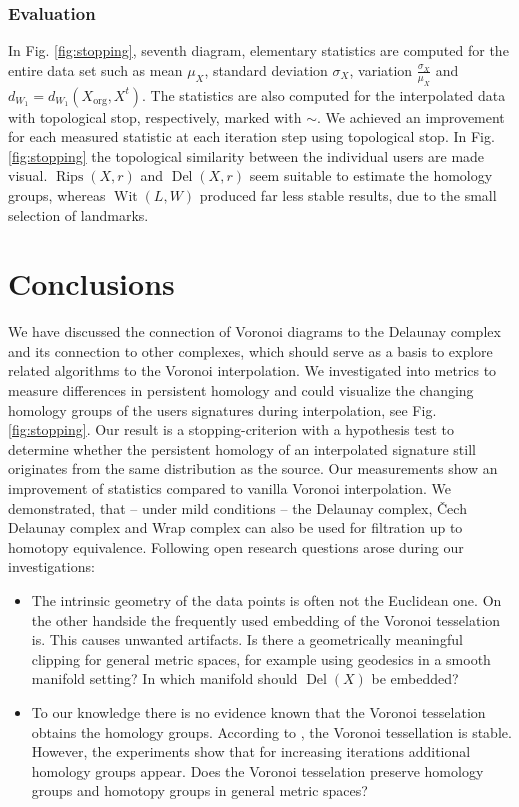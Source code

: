 \documentclass[runningheads]{llncs}
\DeclareMathOperator{\Rips}{\text{Rips}}
\DeclareMathOperator{\Del}{\text{Del}}
\DeclareMathOperator{\Wit}{\text{Wit}}
\begin{document}
\subsubsection{Evaluation} In Fig. \ref{fig:stopping}, seventh diagram, elementary statistics are computed for the entire data set such as mean $\mu_X$, standard deviation $\sigma_X$, variation $\frac{\sigma_X}{\mu_X}$ and $d_{W_1} = d_{W_1}(X_{\text{org}},X^{t})$. The statistics are also computed for the interpolated data with topological stop, respectively, marked with $\sim$. We achieved an improvement for each measured statistic at each iteration step using topological stop. In Fig. \ref{fig:stopping} the topological similarity between the individual users are made visual. $\Rips(X,r)$ and $\Del(X,r)$ seem suitable to estimate the homology groups, whereas $\Wit(L,W)$ produced far less stable results, due to the small selection of landmarks.

\section{Conclusions}
\label{sec:conclusion}
We have discussed the connection of Voronoi diagrams to the Delaunay complex and its connection to other complexes, which should serve as a basis to explore related algorithms to the Voronoi interpolation. We investigated into metrics to measure differences in persistent homology and could visualize the changing homology groups of the users signatures during interpolation, see Fig. \ref{fig:stopping}.
Our result is a stopping-criterion with a hypothesis test to determine whether the persistent homology of an interpolated signature still originates from the same distribution as the source. Our measurements show an improvement of statistics compared to vanilla Voronoi interpolation. We demonstrated, that -- under mild conditions -- the Delaunay complex, \v{C}ech Delaunay complex and Wrap complex can also be used for filtration up to homotopy equivalence. Following open research questions arose during our investigations:
\begin{itemize}
  \item The intrinsic geometry of the data points is often not the Euclidean one. On the other handside the frequently used embedding of the Voronoi tesselation is. This causes unwanted artifacts. Is there a geometrically meaningful clipping for general metric spaces, for example using geodesics in a smooth manifold setting? In which manifold should $\Del(X)$ be embedded?
  \item To our knowledge there is no evidence known that the Voronoi tesselation obtains the homology groups. According to \cite{reem2011geometric}, the Voronoi tessellation is stable. However, the experiments show that for increasing iterations additional homology groups appear. Does the Voronoi tesselation preserve homology groups and homotopy groups in general metric spaces?
\end{itemize}
%
%


\end{document}
